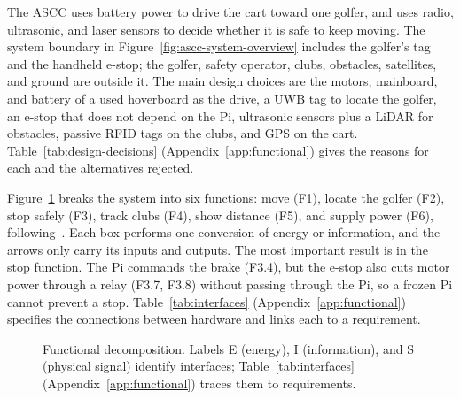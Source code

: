 \label{sec:functional}

\label{sec:func-overview}

The \ac{ASCC} uses battery power to drive the cart toward one golfer, and uses radio, ultrasonic, and laser sensors to decide whether it is safe to keep moving. The system boundary in Figure~\ref{fig:ascc-system-overview} includes the golfer's tag and the handheld e-stop; the golfer, safety operator, clubs, obstacles, satellites, and ground are outside it. The main design choices are the motors, mainboard, and battery of a used hoverboard as the drive, a \ac{UWB} tag to locate the golfer, an e-stop that does not depend on the Pi, ultrasonic sensors plus a \ac{LiDAR} for obstacles, passive \ac{RFID} tags on the clubs, and \ac{GPS} on the cart. Table~\ref{tab:design-decisions} (Appendix~\ref{app:functional}) gives the reasons for each and the alternatives rejected.

\label{sec:func-decomp}

Figure~\ref{fig:functional} breaks the system into six functions: move (F1), locate the golfer (F2), stop safely (F3), track clubs (F4), show distance (F5), and supply power (F6), following~\cite[\S 4.3]{nasaHandbook}. Each box performs one conversion of energy or information, and the arrows only carry its inputs and outputs. The most important result is in the stop function. The Pi commands the brake (F3.4), but the e-stop also cuts motor power through a relay (F3.7, F3.8) without passing through the Pi, so a frozen Pi cannot prevent a stop. Table~\ref{tab:interfaces} (Appendix~\ref{app:functional}) specifies the connections between hardware and links each to a requirement.

\begin{figure}[!htbp]
\centering

\caption{Functional decomposition. Labels E (energy), I (information), and S (physical signal) identify interfaces; Table~\ref{tab:interfaces} (Appendix~\ref{app:functional}) traces them to requirements.}
\label{fig:functional}
\end{figure}

